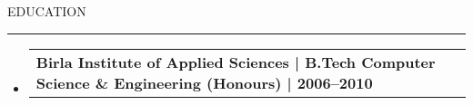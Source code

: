 \documentclass[letterpaper,10pt]{article}
\makeatletter
\newcommand{\subheadingtitlevspace}{\vspace{-3pt}}
\newcommand{\titleItem}[1]{\textbf{#1}}
\newcommand{\resumeProjectHeading}[2]{\item\begin{tabular*}{0.97\textwidth}{l@{\extracolsep{\fill}}r}#1 & \textit{ #2} \\\end{tabular*}\vspace{-6pt}}
\newcommand{\resumeSubHeadingListStart}{\subheadingtitlevspace\begin{itemize}[leftmargin=0.15in, label={}]}
\newcommand{\resumeSubHeadingListEnd}{\end{itemize}}
\newcommand{\ResumeSection}[1]{\par{\fontsize{11pt}{13pt}\selectfont \MakeUppercase{#1}}\vspace{1pt}\hrule height 0.6pt}
\makeatother
\begin{document}
\ResumeSection{Education}\vspace{-4pt}
\resumeSubHeadingListStart
\resumeProjectHeading{\titleItem{Birla Institute of Applied Sciences | B.Tech Computer Science \& Engineering (Honours) | 2006--2010}}{}
\resumeSubHeadingListEnd
\end{document}
